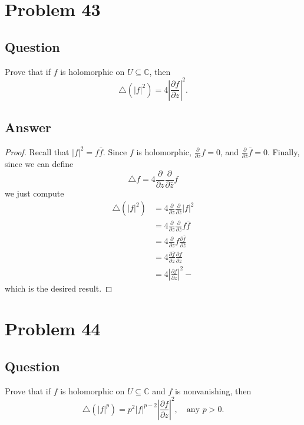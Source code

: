 \documentclass[11pt]{article}
\begin{document}
\section{Problem  43}
\subsection{Question}
Prove that if $f$ is holomorphic on $U \subseteq \mathbb{C}$, then
\[\triangle (|f|^2) =  4 \left| \frac{\partial f }{\partial z }\right|^2.\]
\subsection{Answer}
\begin{proof}
Recall that $|f|^2 = f \bar f$. Since $f$ is holomorphic, $\frac{\partial}{\partial z} f = 0$, and $\frac{\partial}{\partial\bar z} \bar f = 0$.  Finally, since we can define 
\[\triangle f = 4 \frac{\partial}{\partial z} \frac{\partial}{\partial \bar z} f \]
we just compute
\begin{align*}
\triangle ( |f| ^2 ) &= 4 \frac{\partial}{\partial z} \frac{\partial}{\partial \bar z} |f|^2 \\ 
&= 4 \frac{\partial}{\partial z} \frac{\partial}{\partial \bar z} f \bar{f}\\ 
&= 4  \frac{\partial}{\partial z}  f  \frac{\partial \bar f}{ \partial \bar z} \\ 
&=  4   \frac{\partial \bar f}{ \partial \bar z}  \frac{\partial f }{ \partial z}\\ 
&= 4 \left| \frac{\partial f }{\partial z }\right|^2-
\end{align*}
which is the desired result.
\end{proof}

\section{Problem  44}
\subsection{Question}
Prove that if $f$ is holomorphic on $U \subseteq \mathbb{C}$ and $f$ is nonvanishing, then
\[\triangle(|f|^p) = p^2 |f|^{p-2} \left| \frac{\partial f}{\partial z} \right|^2, \quad\mbox{any }p>0.\]
\end{document}
